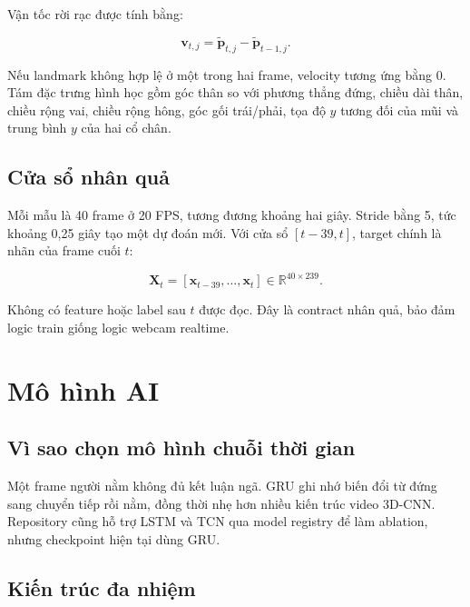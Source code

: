 \documentclass[12pt,a4paper,oneside]{report}
\begin{document}
Vận tốc rời rạc được tính bằng:

\[
\mathbf{v}_{t,j}=\tilde{\mathbf{p}}_{t,j}-\tilde{\mathbf{p}}_{t-1,j}.
\]

Nếu landmark không hợp lệ ở một trong hai frame, velocity tương ứng bằng 0. Tám
đặc trưng hình học gồm góc thân so với phương thẳng đứng, chiều dài thân, chiều
rộng vai, chiều rộng hông, góc gối trái/phải, tọa độ $y$ tương đối của mũi và
trung bình $y$ của hai cổ chân.

\section{Cửa sổ nhân quả}

Mỗi mẫu là 40 frame ở 20 FPS, tương đương khoảng hai giây. Stride bằng 5, tức
khoảng 0,25 giây tạo một dự đoán mới. Với cửa sổ $[t-39,t]$, target chính là
nhãn của frame cuối $t$:

\[
\mathbf{X}_t=[\mathbf{x}_{t-39},\ldots,\mathbf{x}_t]
\in\mathbb{R}^{40\times239}.
\]

Không có feature hoặc label sau $t$ được đọc. Đây là contract nhân quả, bảo đảm
logic train giống logic webcam realtime.

\chapter{Mô hình AI}

\section{Vì sao chọn mô hình chuỗi thời gian}

Một frame người nằm không đủ kết luận ngã. GRU ghi nhớ biến đổi từ đứng sang
chuyển tiếp rồi nằm, đồng thời nhẹ hơn nhiều kiến trúc video 3D-CNN. Repository
cũng hỗ trợ LSTM và TCN qua model registry để làm ablation, nhưng checkpoint
hiện tại dùng GRU.

\section{Kiến trúc đa nhiệm}
\end{document}
